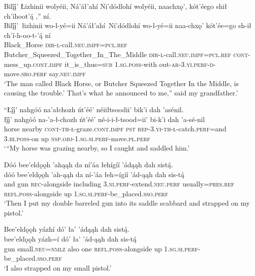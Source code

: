 \newpage
\ea\label{ex:text2-10-3}
Bilį́į́’ Łizhinii wolyéii, Ná’áł’ahí Ni’dódlohí wolyéii, naachxǫ’, kót’éego shił ch’íhoot’ą́ ,'' ní.\\
\gll Bilį́į́’~{łizhinii}	wo-l-yé=ii	Ná’áł’ahí~{Ni’dódlohí}	wo-l-yé=ii	naa-chxǫ’	kót’ée=go	sh-ił	ch’í-h-oo-t-’ą́	ní\\
     Black\_Horse	\textsc{dir}-\textsc{l}-call.\textsc{neu}.\textsc{impf}=\textsc{pcl}.\textsc{ref}	Butcher\_Squeezed\_Together\_In\_The\_Middle	\textsc{dir}-\textsc{l}-call.\textsc{neu}.\textsc{impf}=\textsc{pcl}.\textsc{ref}	\textsc{cont}-mess\_up.\textsc{cont}.\textsc{impf}	it\_is\_thus=\textsc{sub}	1.\textsc{sg}.\textsc{poss}-with	out-\textsc{ar}-3.\textsc{yi}.\textsc{perf}-\textsc{d}-move.\textsc{sro}.\textsc{perf}	say.\textsc{neu}.\textsc{impf}\\
\glt `The man called Black Horse, or Butcher Squeezed Together In the Middle, is causing the trouble.' That's what he announced to me,'' said my grandfather.'
\z

\ea\label{ex:text2-11-1}
``Łį́į́’ nahgóó na’ałchozh ńt’éé’ néiiłtsoodii’ bik’i dah ’asénil.\\
\gll łį́į́’	nahgóó	na-’a-ł-chozh	ńt’éé’	né-i-i-ł-tsood=ii’	bi-k’i	dah	’a-sé-nil\\
     horse	nearby	\textsc{cont}-\textsc{th}-\textsc{ł}-graze.\textsc{cont}.\textsc{impf}	\textsc{pst}	\textsc{rep}-3.\textsc{yi}-\textsc{th}-\textsc{ł}-catch.\textsc{perf}=and	3.\textsc{bi}.\textsc{poss}-on	up	\textsc{nsp}.\textsc{obj}-1.\textsc{sg}.\textsc{si}.\textsc{perf}-move.\textsc{pl}.\textsc{perf}\\
\glt `{``}My horse was grazing nearby, so I caught and saddled him.'
\z

\ea\label{ex:text2-11-2}
Dóó bee’eldǫǫh ’ahąąh da ní’áa łehígíí ’ádąąh dah sistą́.\\
\gll dóó	bee’eldǫǫh	’ah-ąąh	da	ní-’áa	łeh=ígíí	’ád-ąąh	dah	sis-tą́\\
     and	gun	\textsc{rec}-alongside	including	3.\textsc{ni}.\textsc{perf}-extend.\textsc{neu}.\textsc{perf}	usually=\textsc{pres}.\textsc{ref}	\textsc{refl}.\textsc{poss}-alongside	up	1.\textsc{sg}.\textsc{si}.\textsc{perf}-be\_placed.\textsc{sso}.\textsc{perf}\\
\glt `Then I put my double barreled gun into its saddle scabbard and strapped on my pistol.'
\z

\ea\label{ex:text2-11-3}
Bee’eldǫǫh yázhí dó’ ła’ ’ádąąh dah sistą́.\\
\gll bee’eldǫǫh	yázh=í	dó’	ła’	’ád-ąąh	dah	sis-tą́\\
     gun	small.\textsc{neu}=\textsc{nmlz}	also	one	\textsc{refl}.\textsc{poss}-alongside	up	1.\textsc{sg}.\textsc{si}.\textsc{perf}-be\_placed.\textsc{sso}.\textsc{perf}\\
\glt `I also strapped on my small pistol.'
\z

